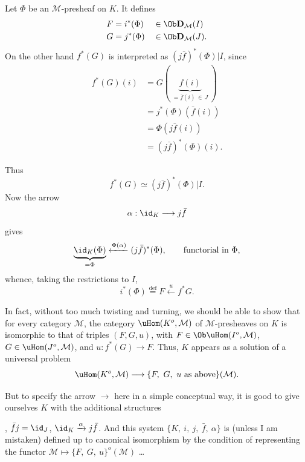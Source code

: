 Let $\Phi$ be an $\mathcal{M}$-presheaf on $K$. It defines
\[
\begin{aligned}
F &= i^*(\Phi) && \in \Ob \mathbf{D}_{\mathcal{M}}(I)\\
G &= j^*(\Phi) && \in \Ob \mathbf{D}_{\mathcal{M}}(J).
\end{aligned}
\]
On the other hand $f^*(G)$ is interpreted as $(j\bar{f})^*(\Phi)|I$, since
\[
\begin{aligned}
f^*(G)(i) &= G(\ \underbrace{f(i)}_{= \bar{f}(i) \,\in\, J}\ )\\
&= j^*(\Phi)(\bar{f}(i))\\
&= \Phi(j\bar{f}(i))\\
&= (j\bar{f})^*(\Phi)(i).
\end{aligned}
\]

Thus
\[ f^*(G) \simeq (j\bar{f})^*(\Phi)|I. \]
Now the arrow
\[ \alpha : \id_K \longrightarrow j\bar{f} \]
gives
\[ \underbrace{\id_K(\Phi)}_{= \Phi} \xleftarrow{\Phi(\alpha)} (j\bar{f})^*(\Phi), \qquad \text{functorial in } \Phi, \]
whence, taking the restrictions to $I$,
\[ i^*(\Phi) \overset{\text{def}}{=} F \xleftarrow{\ u\ } f^*G. \]

In fact, without too much twisting and turning, we should be able to show that for every category $\mathcal{M}$, the category $\uHom(K^o, \mathcal{M})$ of $\mathcal{M}$-presheaves on $K$ is isomorphic to that of triples $(F,G,u)$, with $F \in \Ob \uHom(I^o, \mathcal{M})$, $G \in \uHom(J^o, \mathcal{M})$, and $u : f^*(G) \longrightarrow F$. Thus, $K$ appears as a solution of a universal problem
\[ \uHom(K^o, \mathcal{M}) \longrightarrow \{F,\ G,\ u \text{ as above}\}(\mathcal{M}). \]

But to specify the arrow $\longrightarrow$ here in a simple conceptual way, it is good to give ourselves $K$ with the additional structures , $\bar{f}j = \id_J$, $\id_K \xrightarrow{\alpha} j\bar{f}$. And this system %
$\{K,\ i,\ j,\ \bar{f},\ \alpha\}$ is (unless I am mistaken) defined up to canonical isomorphism by the condition of representing the functor $\mathcal{M} \longmapsto \{F,\ G,\ u\}^o(\mathcal{M})$ \dots

